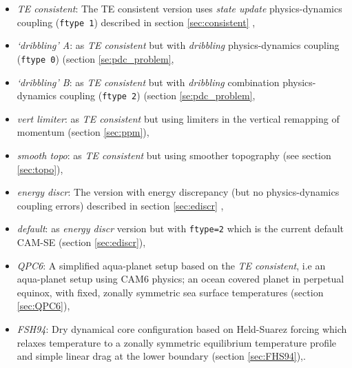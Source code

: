 \documentclass[draft,linenumbers]{agujournal}
\begin{document}
\begin{itemize}
\item {\em{TE consistent}}: The TE consistent version uses {\em{state update}} physics-dynamics coupling ({\tt{ftype 1}}) described in section \ref{sec:consistent} {\color{red}{(this configuration does not have PDC errors and it has the same TE definition in physics and dynamics; and hence the energetically most consistent setup in terms of least number TE error terms)}},
\item {\em{`dribbling' A}}: as {\em{TE consistent}} but with {\em{dribbling}} physics-dynamics coupling ({\tt{ftype 0}}) (section \ref{se:pdc_problem}{\color{red}{; this setup is used to assess PDC errors)}},
\item {\em{`dribbling' B}}: as {\em{TE consistent}} but with  {\em{dribbling}} combination physics-dynamics coupling ({\tt{ftype 2}}) (section \ref{se:pdc_problem}{\color{red}{; this setup is used to assess PDC errors)}},
\item {\em{vert limiter}}: as {\em{TE consistent}} but using limiters in the vertical remapping of momentum (section \ref{sec:ppm}{\color{red}{; experiment used to assess TE errors associated with shape-preserving limiters in vertical remapping}}),
\item {\em{smooth topo}}: as {\em{TE consistent}} but  using smoother topography (see section \ref{sec:topo}{\color{red}{; experiment used to assess TE sensitivity to surface roughness}}),
\item {\em{energy discr}}: The version with energy discrepancy (but no physics-dynamics coupling errors) described in section \ref{sec:ediscr} {\color{red}{(experiment used to estimate energy discrepancy errors)}},
\item {\em{default}}: as {\em{energy discr}} version but with {\tt{ftype=2}} which is the current default CAM-SE (section \ref{sec:ediscr}{\color{red}{; we assess this configuration as it is the default CAM-SE configuration}}),
\item {\em{QPC6}}: A simplified aqua-planet setup based on the {\em{TE consistent}}, i.e an aqua-planet setup using CAM6 physics; an ocean covered planet in perpetual equinox, with fixed, zonally symmetric sea surface temperatures \citep{NH2000ASL,MWO2016JAMES} (section \ref{sec:QPC6}{\color{red}{; experiment use to assess TE errors in a simplified moist environment}}), 
\item {\em{FSH94}}: Dry dynamical core configuration based on Held-Suarez forcing which relaxes temperature to a zonally symmetric equilibrium temperature profile and simple linear drag at the lower boundary \citep{HS1994BAMS} (section \ref{sec:FHS94}{\color{red}{; experiment used to assess if TE errors in one of the simplest climate test cases is representative of full model TE errors}}),. 

\end{itemize}
\end{document}
